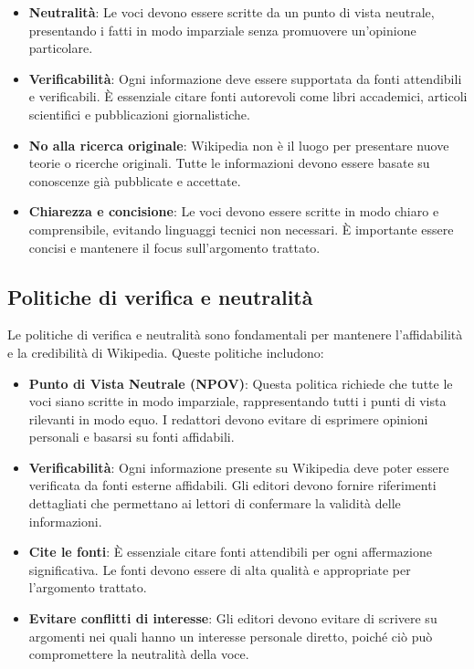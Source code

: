 \documentclass[12pt,a4paper]{report}
\begin{document}
\begin{itemize}
    \item \textbf{Neutralità}: Le voci devono essere scritte da un punto di vista neutrale, presentando i fatti in modo imparziale senza promuovere un'opinione particolare.
    \item \textbf{Verificabilità}: Ogni informazione deve essere supportata da fonti attendibili e verificabili. È essenziale citare fonti autorevoli come libri accademici, articoli scientifici e pubblicazioni giornalistiche.
    \item \textbf{No alla ricerca originale}: Wikipedia non è il luogo per presentare nuove teorie o ricerche originali. Tutte le informazioni devono essere basate su conoscenze già pubblicate e accettate.
    \item \textbf{Chiarezza e concisione}: Le voci devono essere scritte in modo chiaro e comprensibile, evitando linguaggi tecnici non necessari. È importante essere concisi e mantenere il focus sull'argomento trattato.
\end{itemize}

\subsection{Politiche di verifica e neutralità}

Le politiche di verifica e neutralità sono fondamentali per mantenere l'affidabilità e la credibilità di Wikipedia. Queste politiche includono:

\begin{itemize}
    \item \textbf{Punto di Vista Neutrale (NPOV)}: Questa politica richiede che tutte le voci siano scritte in modo imparziale, rappresentando tutti i punti di vista rilevanti in modo equo. I redattori devono evitare di esprimere opinioni personali e basarsi su fonti affidabili.
    \item \textbf{Verificabilità}: Ogni informazione presente su Wikipedia deve poter essere verificata da fonti esterne affidabili. Gli editori devono fornire riferimenti dettagliati che permettano ai lettori di confermare la validità delle informazioni.
    \item \textbf{Cite le fonti}: È essenziale citare fonti attendibili per ogni affermazione significativa. Le fonti devono essere di alta qualità e appropriate per l'argomento trattato.
    \item \textbf{Evitare conflitti di interesse}: Gli editori devono evitare di scrivere su argomenti nei quali hanno un interesse personale diretto, poiché ciò può compromettere la neutralità della voce.
\end{itemize}
\end{document}

